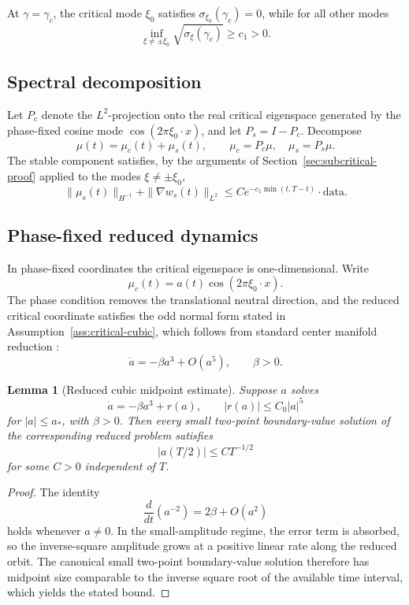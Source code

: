 \documentclass[11pt]{amsart}
\newtheorem{lemma}[theorem]{Lemma}
\theoremstyle{definition}
\theoremstyle{remark}
\newcommand{\gamc}{\gamma_c}
\newcommand{\grad}{\nabla}
\begin{document}
At $\gamma=\gamc$, the critical mode $\xi_0$ satisfies $\sigma_{\xi_0}(\gamc)=0$, while for all other modes
\begin{equation}
\label{eq:stable-gap}
\inf_{\xi\neq\pm\xi_0}\sqrt{\sigma_\xi(\gamc)}\ge c_1>0.
\end{equation}

\subsection{Spectral decomposition}
\label{sub:spectral-decomp}

Let $P_c$ denote the $L^2$-projection onto the real critical eigenspace generated by the phase-fixed cosine mode $\cos(2\pi\xi_0\cdot x)$, and let $P_s = I-P_c$. Decompose
\[
\mu(t) = \mu_c(t) + \mu_s(t),\qquad
\mu_c = P_c\mu,\quad \mu_s = P_s\mu.
\]
The stable component satisfies, by the arguments of Section~\ref{sec:subcritical-proof}
applied to the modes $\xi\neq\pm\xi_0$,
\begin{equation}
\label{eq:stable-decay}
\|\mu_s(t)\|_{H^{-1}}+\|\grad w_s(t)\|_{L^2}
\le Ce^{-c_1\min(t,T-t)}\cdot\text{data}.
\end{equation}

\subsection{Phase-fixed reduced dynamics}
\label{sub:reduced-dynamics}

In phase-fixed coordinates the critical eigenspace is one-dimensional. Write
\[
\mu_c(t)=a(t)\cos(2\pi\xi_0\cdot x).
\]
The phase condition removes the translational neutral direction, and the reduced critical coordinate satisfies the odd normal form stated in Assumption~\ref{ass:critical-cubic}, which follows from standard center manifold reduction \cite{C81}:
\[
\dot a = -\beta a^3 + O(a^5),\qquad \beta>0.
\]

\begin{lemma}[Reduced cubic midpoint estimate]
\label{lem:cubic-midpoint}
Suppose $a$ solves
\[
\dot a = -\beta a^3 + r(a), \qquad |r(a)|\le C_0|a|^5
\]
for $|a|\le a_\ast$, with $\beta>0$. Then every small two-point boundary-value solution of the corresponding reduced problem satisfies
\[
|a(T/2)|\le C T^{-1/2}
\]
for some $C>0$ independent of $T$.
\end{lemma}

\begin{proof}
The identity
\[
\frac{d}{dt}(a^{-2}) = 2\beta + O(a^2)
\]
holds whenever $a\neq 0$. In the small-amplitude regime, the error term is absorbed, so the inverse-square amplitude grows at a positive linear rate along the reduced orbit. The canonical small two-point boundary-value solution therefore has midpoint size comparable to the inverse square root of the available time interval, which yields the stated bound.
\end{proof}
\end{document}
